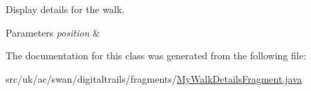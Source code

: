 Display details for the walk. 


\begin{DoxyParams}{Parameters}
{\em position} & \\
\hline
\end{DoxyParams}


The documentation for this class was generated from the following file\+:\begin{DoxyCompactItemize}
\item 
src/uk/ac/swan/digitaltrails/fragments/\hyperlink{_my_walk_details_fragment_8java}{My\+Walk\+Details\+Fragment.\+java}\end{DoxyCompactItemize}
